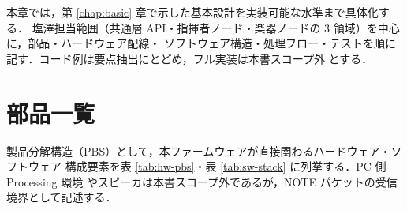 \documentclass[lualatex,book,paper=a4paper,jafontsize=11.5pt,jafontscale=1.05]{jlreq}
\begin{document}

本章では，第 \ref{chap:basic} 章で示した基本設計を実装可能な水準まで具体化する．
塩澤担当範囲（共通層 API・指揮者ノード・楽器ノードの 3 領域）を中心に，部品・ハードウェア配線・
ソフトウェア構造・処理フロー・テストを順に記す．コード例は要点抽出にとどめ，フル実装は本書スコープ外
とする．


\section{部品一覧}\label{sec:parts-list}

製品分解構造（PBS）として，本ファームウェアが直接関わるハードウェア・ソフトウェア
構成要素を表 \ref{tab:hw-pbs}・表 \ref{tab:sw-stack} に列挙する．PC 側 Processing 環境
やスピーカは本書スコープ外であるが，NOTE パケットの受信境界として記述する．
\end{document}
